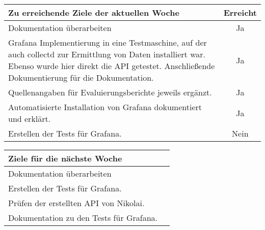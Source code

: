 \begin{tabularx}{\textwidth}{Xc}
    \arrayrulecolor{OliveGreen}
    \toprule
    {\bfseries Zu erreichende Ziele der aktuellen Woche} & {\bfseries Erreicht} \\
    \midrule[2pt]
    Dokumentation überarbeiten                              &Ja              \\
    \rowcolor{OliveGreen!15}
    Grafana Implementierung in eine Testmaschine, auf der auch collectd zur 
    Ermittlung von Daten installiert war. Ebenso wurde hier direkt die API
    getestet. Anschließende Dokumentierung für die Dokumentation.  &Ja        \\
    \rowcolor{White}
    Quellenangaben für Evaluierungsberichte jeweils ergänzt. &Ja             \\
    \rowcolor{OliveGreen!15}
    Automatisierte Installation von Grafana dokumentiert und erklärt.  &Ja   \\
    \rowcolor{White}
    Erstellen der Tests für Grafana.                         &Nein            \\
   \bottomrule[2pt]
\end{tabularx}
%
\vspace{1cm}
%
\begin{tabularx}{\textwidth}{Xc}
    \arrayrulecolor{OliveGreen}
    \toprule
    {\bfseries Ziele für die nächste Woche}        &                         \\
    \midrule[2pt]
    Dokumentation überarbeiten                     &                         \\
    \rowcolor{OliveGreen!15}
    Erstellen der Tests für Grafana.               &                          \\
    \rowcolor{White}
    Prüfen der erstellten API von Nikolai.         &                          \\
    \rowcolor{OliveGreen!15}
    Dokumentation zu den Tests für Grafana.        &                          \\
\end{tabularx}
